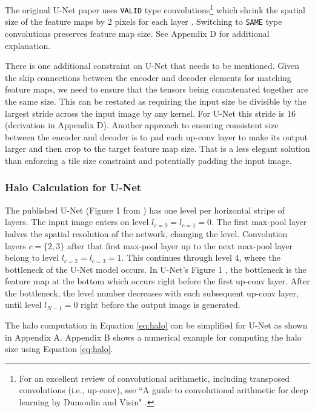\documentclass[10pt, indentfirst]{article}
\begin{document}
The original U-Net paper uses \texttt{VALID} type convolutions\footnote{For an excellent review of convolutional arithmetic, including transposed convolutions (i.e., up-conv), see ``A guide to convolutional arithmetic for deep learning by Dumoulin and Visin" \citep{Dumoulin2018}.} which shrink the spatial size of the feature maps by 2 pixels for each layer \citep{Dumoulin2018}.
Switching to \texttt{SAME} type convolutions preserves feature map size.
See Appendix D for additional explanation.

There is one additional constraint on U-Net that needs to be mentioned.
Given the skip connections between the encoder and decoder elements for matching feature maps, we need to ensure that the tensors being concatenated together are the same size.
This can be restated as requiring the input size be divisible by the largest stride across the input image by any kernel.
For U-Net this stride is $16$ (derivation in Appendix D).
Another approach to ensuring consistent size between the encoder and decoder is to pad each up-conv layer to make its output larger and then crop to the target feature map size.
That is a less elegant solution than enforcing a tile size constraint and potentially padding the input image.


\subsubsection{Halo Calculation for U-Net}

The published U-Net (Figure 1 from \citep{Ronneberger2015a}) has one level per horizontal stripe of layers.
The input image enters on level $l_{c=0} = l_{c=1} = 0$.
The first max-pool layer halves the spatial resolution of the network, changing the level.
Convolution layers $c = \{2, 3\}$ after that first max-pool layer up to the next max-pool layer belong to level $l_{c=2}=l_{c=3} = 1$.
This continues through level 4, where the bottleneck of the U-Net model occurs.
In U-Net's Figure 1 \citep{Ronneberger2015a}, the bottleneck is the feature map at the bottom which occurs right before the first up-conv layer.
After the bottleneck, the level number decreases with each subsequent up-conv layer, until level $l_{N-1} = 0$ right before the output image is generated.

The halo computation in Equation \ref{eq:halo} can be simplified for U-Net as shown in Appendix A.
Appendix B shows a numerical example for computing the halo size using Equation \ref{eq:halo}.
\end{document}
